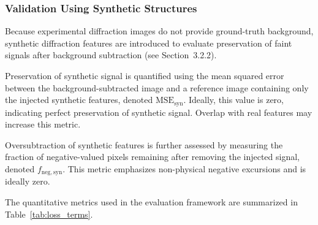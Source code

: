 \documentclass[iucr]{iucrjournals}
\begin{document}
\subsubsection{Validation Using Synthetic Structures}

Because experimental diffraction images do not provide ground-truth background, synthetic diffraction features are introduced to evaluate preservation of faint signals after background subtraction (see Section~3.2.2). 

Preservation of synthetic signal is quantified using the mean squared error between the background-subtracted image and a reference image containing only the injected synthetic features, denoted $\mathrm{MSE}_{\mathrm{syn}}$. Ideally, this value is zero, indicating perfect preservation of synthetic signal. 
Overlap with real features may increase this metric.



Oversubtraction of synthetic features is further assessed by measuring the fraction of negative-valued pixels remaining after removing the injected signal, denoted $f_{\mathrm{neg,syn}}$. This metric emphasizes non-physical negative excursions and is ideally zero.


The quantitative metrics used in the evaluation framework are summarized in Table~\ref{tab:loss_terms}.
\end{document}
